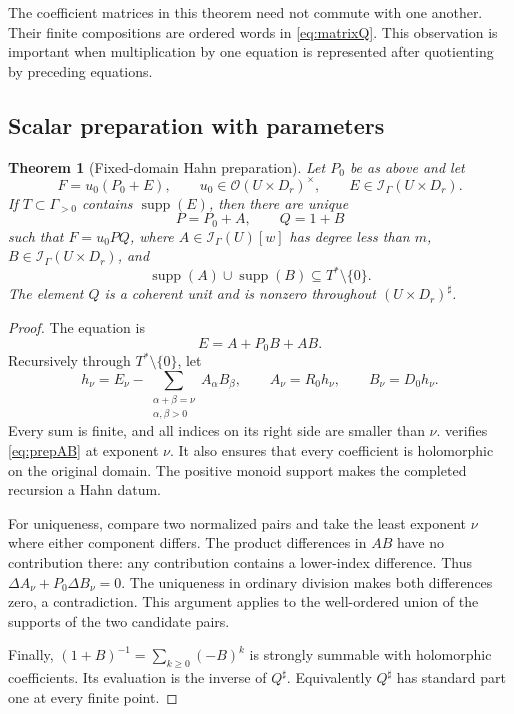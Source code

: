\documentclass[11pt,oneside]{article}
\numberwithin{equation}{section}
\newtheorem{theorem}{Theorem}[section]
\theoremstyle{definition}
\theoremstyle{remark}\newtheorem{remark}[theorem]{Remark}
\newcommand{\OO}{\mathcal O}
\newcommand{\Ip}{\mathcal I_{\Gamma}}
\newcommand{\sh}{^{\sharp}}
\newcommand{\supp}{\operatorname{supp}}
\begin{document}
The coefficient matrices in this theorem need not commute with one another. Their finite compositions are ordered words in \eqref{eq:matrixQ}. This observation is important when multiplication by one equation is represented after quotienting by preceding equations.

\subsection{Scalar preparation with parameters}
\begin{theorem}[Fixed-domain Hahn preparation]\label{thm:preparation}
Let \(P_0\) be as above and let
\[
 F=u_0(P_0+E),
 \qquad u_0\in\OO(U\times D_r)^\times,
 \qquad E\in\Ip(U\times D_r).
\]
If \(T\subset\Gamma_{>0}\) contains \(\supp(E)\), then there are unique
\[
 P=P_0+A,\qquad Q=1+B
\]
such that \(F=u_0PQ\), where \(A\in\Ip(U)[w]\) has degree less than \(m\), \(B\in\Ip(U\times D_r)\), and
\[
 \supp(A)\cup\supp(B)\subseteq T^*\setminus\{0\}.
\]
The element \(Q\) is a coherent unit and is nonzero throughout \((U\times D_r)\sh\).
\end{theorem}
\begin{proof}
The equation is
\begin{equation}\label{eq:prepAB}
 E=A+P_0B+AB.
\end{equation}
Recursively through \(T^*\setminus\{0\}\), let
\[
 h_\nu=E_\nu-
 \sum_{\substack{\alpha+\beta=\nu\\\alpha,\beta>0}}A_\alpha B_\beta,
 \qquad A_\nu=R_0h_\nu,
 \qquad B_\nu=D_0h_\nu.
\]
Every sum is finite, and all indices on its right side are smaller than \(\nu\).  verifies \eqref{eq:prepAB} at exponent \(\nu\). It also ensures that every coefficient is holomorphic on the original domain. The positive monoid support makes the completed recursion a Hahn datum.

For uniqueness, compare two normalized pairs and take the least exponent \(\nu\) where either component differs. The product differences in \(AB\) have no contribution there: any contribution contains a lower-index difference. Thus \(\Delta A_\nu+P_0\Delta B_\nu=0\). The uniqueness in ordinary division makes both differences zero, a contradiction. This argument applies to the well-ordered union of the supports of the two candidate pairs.

Finally, \((1+B)^{-1}=\sum_{k\geq0}(-B)^k\) is strongly summable with holomorphic coefficients. Its evaluation is the inverse of \(Q\sh\). Equivalently \(Q\sh\) has standard part one at every finite point.
\end{proof}
\end{document}
